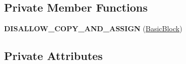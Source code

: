 \subsection*{Private Member Functions}
\begin{DoxyCompactItemize}
\item 
{\bfseries D\+I\+S\+A\+L\+L\+O\+W\+\_\+\+C\+O\+P\+Y\+\_\+\+A\+N\+D\+\_\+\+A\+S\+S\+I\+GN} (\hyperlink{classv8_1_1internal_1_1compiler_1_1_basic_block}{Basic\+Block})\hypertarget{classv8_1_1internal_1_1compiler_1_1_basic_block_a5bfff68b7c40a4e2dadf464c128d7635}{}\label{classv8_1_1internal_1_1compiler_1_1_basic_block_a5bfff68b7c40a4e2dadf464c128d7635}

\end{DoxyCompactItemize}
\subsection*{Private Attributes}
